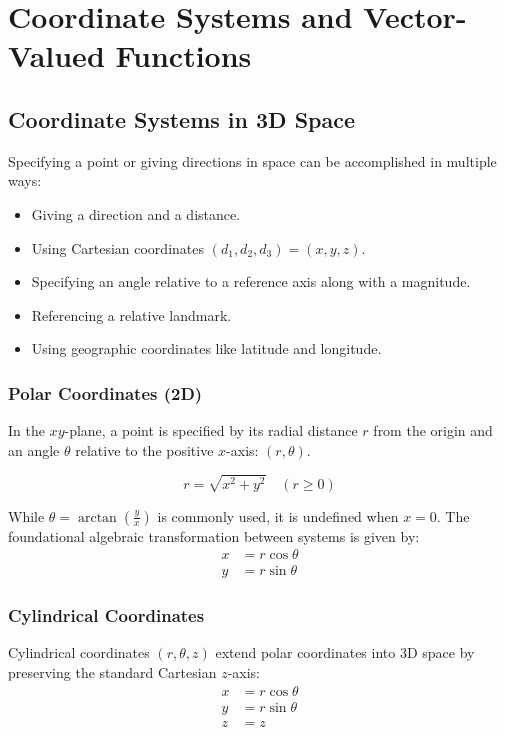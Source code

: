 \section{Coordinate Systems and Vector-Valued Functions}

\subsection{Coordinate Systems in 3D Space}

Specifying a point or giving directions in space can be accomplished in multiple ways:
\begin{itemize}
    \item Giving a direction and a distance.
    \item Using Cartesian coordinates $(d_1, d_2, d_3) = (x, y, z)$.
    \item Specifying an angle relative to a reference axis along with a magnitude.
    \item Referencing a relative landmark.
    \item Using geographic coordinates like latitude and longitude.
\end{itemize}

\subsubsection{Polar Coordinates (2D)}
In the $xy$-plane, a point is specified by its radial distance $r$ from the origin and an angle $\theta$ relative to the positive $x$-axis: $(r, \theta)$.

\[
r = \sqrt{x^2 + y^2} \quad (r \ge 0)
\]

While $\theta = \arctan\left(\frac{y}{x}\right)$ is commonly used, it is undefined when $x = 0$. The foundational algebraic transformation between systems is given by:
\begin{align*}
x &= r\cos\theta \\
y &= r\sin\theta
\end{align*}


\subsubsection{Cylindrical Coordinates}
Cylindrical coordinates $(r, \theta, z)$ extend polar coordinates into 3D space by preserving the standard Cartesian $z$-axis:
\begin{align*}
x &= r\cos\theta \\
y &= r\sin\theta \\
z &= z
\end{align*}

